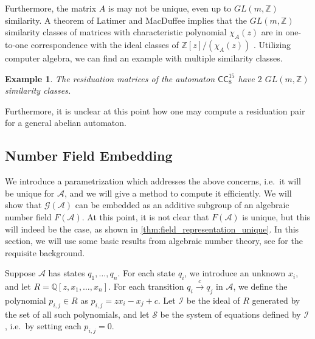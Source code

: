 \documentclass[12pt, letterpaper]{article}
\newcommand{\Z}{\mathbb Z}
\newcommand{\Q}{\mathbb Q}
\newcommand{\A}{\mathcal A}
\newcommand{\CC}{\mathsf{CC}}
\newcommand{\I}{\mathcal I}
\renewcommand{\S}{\mathcal S}
\newcommand{\gp}{\mathcal G}
\newtheorem{example}[thm]{Example}
\begin{document}
Furthermore, the matrix $A$ is may not be unique, even up to $GL(m, \Z)$
similarity.  A theorem of Latimer and MacDuffee implies that the $GL(m, \Z)$
similarity classes of matrices with characteristic polynomial $\chi_A(z)$ are
in one-to-one correspondence with the ideal classes of $\Z[z]/(\chi_A(z))$
\cite{latimer-macduffee}.  Utilizing computer algebra, we can find an example
with multiple similarity classes.
\begin{example}
    The residuation matrices of the automaton $\CC^{15}_8$ have $2$ $GL(m, \Z)$
    similarity classes.
\end{example}

Furthermore, it is unclear at this point how one may compute a residuation pair
for a general abelian automaton.

\subsection{Number Field Embedding}\label{sec:field-rep}
We introduce a parametrization which addresses the above concerns, i.e.\ it
will be unique for $\A$, and we will give a method to compute it efficiently.
We will show that $\gp(\A)$ can be embedded as an additive subgroup of an
algebraic number field $F(\A)$. At this point, it is not clear that $F(\A)$ is
unique, but this will indeed be the case, as shown in
\cref{thm:field_representation_unique}.  In this section, we will use some
basic results from algebraic number theory, see \cite{ireland1990classical,
stein2012algebraic} for the requisite background.

Suppose $\A$ has states $q_1, \ldots, q_n$. For each state $q_i$, we introduce
an unknown $x_i$, and let $R = \Q[z, x_1, \ldots, x_n]$. For each transition
$q_i \xrightarrow{c} q_j$ in $\A$, we define the polynomial
$p_{i,j} \in R$ as $p_{i,j} = z x_i - x_j + c$. Let $\I$ be the ideal of $R$
generated by the set of all such polynomials, and let $\S$ be the system of
equations defined by $\I$, i.e.\ by setting each $p_{i,j} = 0$.
\end{document}
